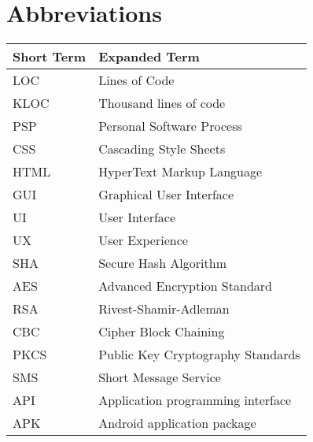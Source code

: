 \chapter{Abbreviations}




\begin{tabular}{p{40mm}|p{100mm}}
	\textbf{Short Term}&\textbf{Expanded Term}\\
	\hline
	LOC		&	Lines of Code\\
	KLOC	&	Thousand lines of code\\
	PSP		& 	Personal Software Process\\
	CSS 		& Cascading Style Sheets\\
	HTML 	& HyperText Markup Language\\
	GUI		& Graphical User Interface\\
	UI			& User Interface\\
	UX 		& User Experience\\
	SHA 		& Secure Hash Algorithm\\
	AES		& Advanced Encryption Standard\\
	RSA		& Rivest-Shamir-Adleman\\
	CBC 		& Cipher Block Chaining\\
	PKCS 	& Public Key Cryptography Standards\\
	SMS 		& Short Message Service\\
	API		& Application programming interface\\
	APK		& Android application package\\
\end{tabular}